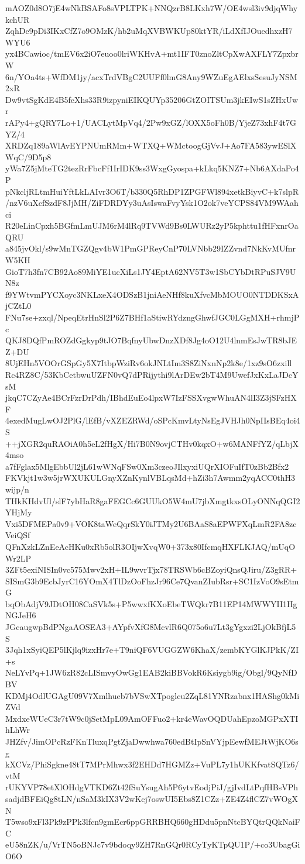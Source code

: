 mAOZ0d8O7jE4wNkBSAFo8sVPLTPK+NNQzrB8LKxh7W/OE4wsl3iv9djqWhykchUR
ZqhDe9pDi3IKxCfZ7o9OMzK/hb2uMqXVBWKUp80ktYR/iLdXfIJOuedhxzH7WYU6
yx4BCawioc/tmEV6x2iO7euoo0lriWKHvA+mt1IFT0znoZltCpXwAXFLY7ZpxbrW
6n/YOa4ts+WfDM1jy/acxTrdVBgC2UUFf0lmG8Any9WZuEgAElxsSesuJyNSM2xR
Dw9vtSgKdE4B5feXhs33R9izpyniEIKQUYp35206GtZOITSUm3jkEIwS1sZHxUwr
rAPy4+gQRY7Lo+1/UACLytMpVq4/2Pw9xGZ/lOXX5oFh0B/YjeZ73xhF4t7GYZ/4
XRDZq189aWlAvEYPNUmRMm+WTXQ+WMctoogGjVvJ+Ao7FA583ywESlXWqC/9D5p8
yWa7Z5jMteTG2tezRrFbcFf1IrIDK9ss3WxgGyospa+kLkq5KNZ7+Nb6AXdaPo4P
pNkcljRLtmHuiYftLkLAIvr3O6T/b330Q5RhDP1ZPGFWl894xetkBiyvC+k7slpR
/nzV6uXcfSzdF8JjMH/ZiFDRDYy3uAsIswaFvyYsk1O2ok7veYCPS84VM9WAahci
R20eLinCpxh5BGfmLmUJM6rM4lRq9TVWd9Bs0LWURz2yP5kphttu1fHFxnrOaQRU
a845jvOkl/s9wMnTGZQgv4bW1PmGPReyCnP70LVNbb29IZZvnd7NkKvMUfnrW5KH
GioT7h3fn7CB92Ao89MiYE1ucXiLs1JY4EptA62NV5T3w1SbCYbDtRPuSJV9UN8z
f9YWtvmPYCXoyc3NKLxeX4ODSzB1jniAeNHf8kuXfvcMbMOUO0NTDDKSxAjCZtL0
FNu7se+zxql/NpeqEtrHnSl2P6Z7BHf1aStiwRYdzngGhwfJGC0LGgMXH+rhmjPc
QKJ8DQfPmROZdGgkyp9tJO7BqfnyUbwDnzXDf8Jg4oO12U4lnmEsJwTR8bJEZ+DU
8UjEHn5VOOrGSpGy5X7ItbpWziRv6okJNLtIm3S8ZiNxnNp2k8e/1xz9sO6zxill
Rc4RZ8C/53KbCetbwuUZFN0vQ7dPRijythi9lArDEw2bT4M9UwefJxKxLaJDcYsM
jkqC7CZyAe4BCrFzrDrPdh/IBhdEuEo4lpxW7IzFSSXvgwWhuAN4lI3Z3jSFzHXF
4exedMugLwOJ2PlG/lEfB/vXZEZRWd/oSPcKmvLtyNsEgJVHJh0NpIIsBEq4oi4S
++jXGR2quRAOiA0h5eL2fHgX/Hi7B0N9ovjCTHv0kqxO+w6MANFfYZ/qLbjX4mso
a7fFglax5MlgEbbUl2jL61wWNqFSw0Xm3czeoJIlxyxiUQrXIOFuIfT0zBb2Bfx2
FKVkjt1w3w5jrWXUKULGnyXZnKynlVBLqsMd+hZi3h7Awmm2yqACC0thH3wijp/n
THkKHdvUl/slF7ybHaR8gaFEGCc6GUUkO5W4mU7jbXmgtkxsOLyONNqQGI2YHjMy
Vxi5DFMEPa0v9+VOK8taWeQqrSkY0iJTMy2U6BAaS8aEPWFXqLmR2FA8zcVeiQSf
QFnXzkLZnEeAcHKu0xRb5olR3OIjwXvqW0+373x80IfcmqHXFLKJAQ/mUqOWr2LP
3ZFt5exiNISIn0vc575Mwv2xH+IL9wvrTjx78TRSWb6cBZoyiQnsQJiru/Z3gRR+
SISmG3b9EcbJyrC16YOmX4TlDzOoFhzJr96Ce7QvanZIubRsr+SC1IzVoO9sEtmG
bqObAdjV9JDtOH08CaSVk5s+P5wwxfKXoEbeTWQkr7B11EP14MWWYII1HgNGJeH6
JGcaugwpBdPNgaAOSEA3+AYpfvXfG8McvlR6Q075o6u7Lt3gYgxzi2LjOkBfjL5S
3Jqh1xSyiQEP5lKjlq9izxHr7e+T9niQF6VUGGZW6KhaX/zembKYGlKJPkK/ZI+s
NeLYvPq+1JW6zR82cLISmvyOwGg1EAB2kiBBVokR6Ksiygb9ig/Obgl/9QyNfDBV
KDMj4OdlUGAgU09V7Xmlhueb7bVSwXTpoglcu2ZqL81YNRzabnx1HAShg0kMiZVd
MxdxeWUeC3r7tW9c0jSetMpL09AmOFFuo2+kr4eWavOQDUahEpzoMGPxXTIhLhWr
JHZfv/JimOPcRzFKnTluxqPgtZjaDwwhwa760edBtIpSnVYjpEewfMEJtWjKO6sg
kXCVz/PhiSgkne48tT7MPrMhwx3f2EHDd7HGMZz+VuPL7y1hUKKfvatSQTz6/vtM
rUKYVP78etXlOHdgVTKD6Zt42fSuYsugAh5P6ytvEodjPiJ/gjIvdLtPqfHBsVPh
sadjdBFEiQg8tLN/nSaM3kIX3V2wKcj7oswUI5Ebs8Z1CZz+ZE4Z4flCZ7vWOgXN
T5wso9xFl3Pk9zPPk3lfcn9gmEcr6ppGRRBHQ660gHDdu5pnNtcBYQtrQQkNaiFC
eU58nZK/u/VrTN5oBNJc7v9bdoqy9ZH7RnGQr0RCyTyKTpQU1P/+co3UbagGiO6O
